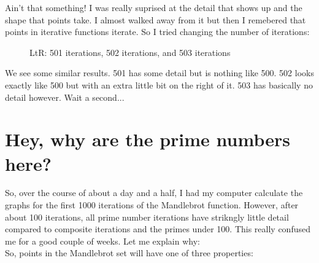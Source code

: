 \documentclass[letterpaper,12pt]{article}
\begin{document}
Ain't that something! I was really suprised at the detail that shows up and the shape that points take.
I almost walked away from it but then I remebered that points in iterative functions iterate. So I tried changing the number of iterations:

\begin{figure}[h]
	\noindent{}
	\centering
	\caption{LtR: 501 iterations, 502 iterations, and 503 iterations}
\end{figure}

We see some similar results. 501 has some detail but is nothing like 500. 502 looks exactly like 500 but with an extra little bit on the right of it.
503 has basically no detail however. Wait a second...

\section{Hey, why are the prime numbers here?}

So, over the course of about a day and a half, I had my computer calculate the graphs for the first 1000 iterations of the Mandlebrot function. However, after about 
100 iterations, all prime number iterations have strikngly little detail compared to composite iterations and the primes under 100. This really confused me for a good 
couple of weeks. Let me explain why:
\\
So, points in the Mandlebrot set will have one of three properties:
\end{document}

